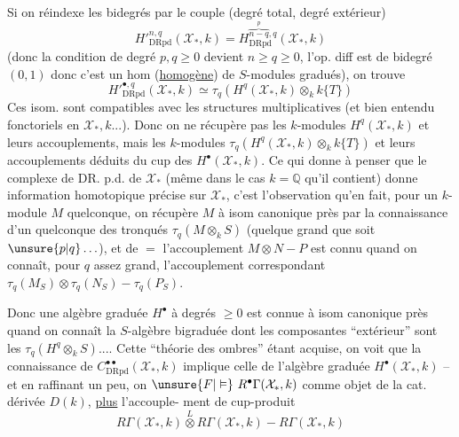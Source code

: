 Si on réindexe les bidegrés par le couple (degré total, degré extérieur)
\[
H'^{n,q}_{\mathrm{DRpd}}(\mathcal X_*,k)=H^{\overbrace{n-q}^{p},q}_{\mathrm{DRpd}}(\mathcal X_*,k)
\]
(donc la condition de degré $p,q\geq0$ devient $n\geq q\geq0$, l'op. diff est de bidegré $(0,1)$ donc c'est un hom (\uline{homogène}) de $S$-modules gradués), on trouve
\[
H'^{\bullet,q}_{\mathrm{DRpd}}(\mathcal X_*,k)\simeq\tau_q\left(H^q(\mathcal X_*,k)\otimes_k k\{T\}\right)
\]
Ces isom. sont compatibles avec les structures multiplicatives (et bien entendu fonctoriels en $\mathcal X_*,k$...). Donc  on ne récupère pas  les $k$-modules $H^q(\mathcal X_*,k)$ et leurs accouplements, mais les $k$-modules  $\tau_q(H^q(\mathcal X_*,k)\otimes_k k\{T\})$ et leurs accouplements déduits du cup des $H^\bullet(\mathcal X_*,k)$.
Ce qui donne à penser que le complexe de DR. p.d. de $\mathcal X_*$  (même dans le cas $k=\mathbb Q$ qu'il contient) donne  information homotopique précise sur $\mathcal X_*$, c'est l'observation qu'en fait, pour un  $k$-module $M$ quelconque, on récupère $M$ à isom canonique près par la connaissance d'un quelconque des tronqués $\tau_q(M\otimes_k S)$  (quelque grand que soit $\unsure{p|q}\ldots$), et de $=$ l'accouplement $M\otimes N\mathbin{-}P$ est connu quand on connaît, pour $q$ assez grand, l'accouplement correspondant $\tau_q(M_S)\otimes\tau_q(N_S)\mathbin{-}\tau_q(P_S)$.

Donc une algèbre graduée $H^\bullet$ à degrés $\geq0$  est connue à isom canonique près quand on connaît la $S$-algèbre bigraduée dont les composantes  ``extérieur''  sont les $\tau_q(H^q\otimes_k S)$....  Cette ``théorie des ombres'' étant  acquise, on voit que la connaissance de $C^{\bullet\bullet}_{\mathrm{DRpd}}(\mathcal X_*,k)$  implique celle de l'algèbre graduée $H^\bullet(\mathcal X_*,k)$ -- et en raffinant un peu, on  $\unsure{F|\vDash}\ R^\bullet\Gamma(\mathcal X_*,k)$ comme objet de la cat. dérivée $D(k)$, \uline{plus} l'accouple-
ment de cup-produit
\[
R\Gamma(\mathcal X_*,k)\overset{L}{\otimes}R\Gamma(\mathcal X_*,k)\mathbin{-}R\Gamma(\mathcal X_*,k)
\]

